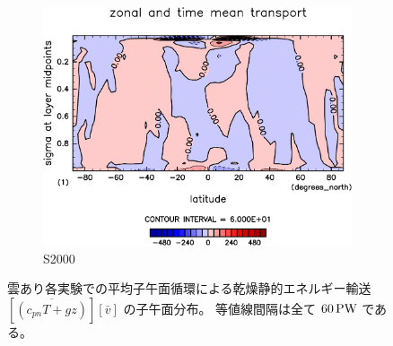\documentclass[body]{subfiles}
\begin{document}
\begin{figure}[t]
\begin{subfigure}{.4\textwidth}
		\centering
		\includegraphics[width=\textwidth]{S2000/MeriHeatTransTest@dryStatEn_M,time=7300:7665-crop-rotate.pdf}
		\caption{S2000}\label{乾燥静的エネルギー平均子午面循環S2000}
	\end{subfigure}
	\caption[雲あり各実験での平均子午面循環による乾燥静的エネルギー輸送の子午面分布]{
		雲あり各実験での平均子午面循環による乾燥静的エネルギー輸送 \([\overline{(c_{pn}T+gz)}][\bar v]\) の子午面分布。
		等値線間隔は全て \(60\hmu{PW}\) である。
	}\label{乾燥静的エネルギー平均子午面循環}
\end{figure}
\end{document}
